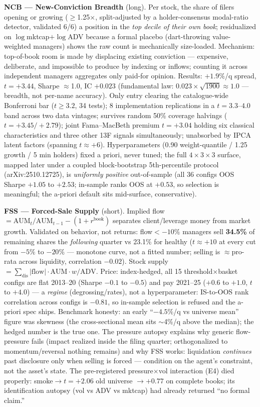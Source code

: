 \documentclass[10pt]{article}
\begin{document}
\textbf{NCB --- New-Conviction Breadth} (long). Per stock, the share
of filers opening or growing ($\ge$1.25$\times$, split-adjusted by a
holder-consensus modal-ratio detector, validated 6/6) a position in
the \emph{top decile of their own book}; residualized on
$\log$mktcap$+\log$ADV because a formal placebo (dart-throwing
value-weighted managers) shows the raw count is mechanically
size-loaded. Mechanism: top-of-book room is made by displacing
existing conviction --- expensive, deliberate, and impossible to
produce by indexing or inflows; counting it across independent
managers aggregates only paid-for opinion. Results: $+1.9\%$/q
spread, $t=+3.44$, Sharpe $\approx$1.0, IC $+0.023$ (fundamental
law: $0.023\times\sqrt{1900}\approx1.0$ --- breadth, not per-name
accuracy). Only entry clearing the catalogue-wide Bonferroni bar
($t\ge3.2$, 34 tests); 8 implementation replications in a
$t=3.3$--$4.0$ band across two data vintages; survives random 50\%
coverage halvings ($t=+3.45/+2.79$); joint Fama--MacBeth premium
$t=+3.04$ holding six classical characteristics and three other 13F
signals simultaneously; unabsorbed by IPCA latent factors
(spanning $t\approx+6$). Hyperparameters (0.90 weight-quantile /
1.25 growth / 5 min holders) fixed a priori, never tuned; the full
$4{\times}3{\times}3$ surface, mapped later under a coupled
block-bootstrap 5th-percentile protocol (arXiv:2510.12725), is
\emph{uniformly positive} out-of-sample (all 36 configs OOS Sharpe
$+1.05$ to $+2.53$; in-sample ranks OOS at $+0.53$, so selection is
meaningful; the a-priori default sits mid-surface, conservative).

\textbf{FSS --- Forced-Sale Supply} (short). Implied flow
$=\mathrm{AUM}_t/\mathrm{AUM}_{t-1}-(1+r^{\mathrm{book}})$ separates
client/leverage money from market growth. Validated on behavior, not
returns: flow$<-10\%$ managers sell \textbf{34.5\%} of remaining
shares the \emph{following} quarter vs 23.1\% for healthy
($t\approx+10$ at every cut from $-5\%$ to $-20\%$ --- monotone
curve, not a fitted number; selling is $\approx$pro-rata across
liquidity, correlation $-0.02$). Stock supply
$=\sum_{\mathrm{dis}}|\mathrm{flow}|{\cdot}\mathrm{AUM}{\cdot}w/
\mathrm{ADV}$. Price: index-hedged, all 15 threshold$\times$basket
configs are flat 2013--20 (Sharpe $-0.1$ to $-0.5$) and pay 2021--25
($+0.6$ to $+1.0$, $t$ to $+4.0$) --- a \emph{regime}
(degrossing/rates), not a hyperparameter: IS-to-OOS rank correlation
across configs is $-0.81$, so in-sample selection is refused and the
a-priori spec ships. Benchmark honesty: an early
``$-4.5\%$/q vs universe mean'' figure was skewness (the
cross-sectional mean sits $\sim$4\%/q above the median); the hedged
number is the true one. The pressure autopsy explains why generic
flow-pressure fails (impact realized inside the filing quarter;
orthogonalized to momentum/reversal nothing remains) and why FSS
works: liquidation \emph{continues} past disclosure only when
selling is forced --- condition on the agent's constraint, not the
asset's state. The pre-registered pressure$\times$vol interaction
(E4) died properly: smoke$\to t{=}+2.06$ old universe $\to+0.77$ on
complete books; its identification autopsy (vol vs ADV vs mktcap)
had already returned ``no formal claim.''
\end{document}
